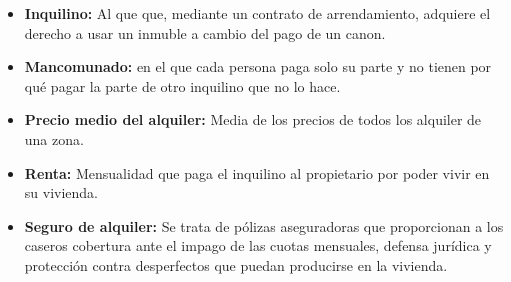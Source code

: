 \begin{itemize}
\item \textbf{Inquilino:} Al que que, mediante un contrato de arrendamiento, adquiere el derecho a usar un inmuble a cambio del pago de un canon.

\item \textbf{Mancomunado:} en el que cada persona paga solo su parte y no tienen por qué pagar la parte de otro inquilino que no lo hace. 

\item \textbf{Precio medio del alquiler:} Media de los precios de todos los alquiler de una zona.

\item \textbf{Renta:} Mensualidad que paga el inquilino al propietario por poder vivir en su vivienda.

\item \textbf{Seguro de alquiler:} Se trata de pólizas aseguradoras que proporcionan a los caseros cobertura ante el impago de las cuotas mensuales, defensa jurídica y protección contra desperfectos que puedan producirse en la vivienda.

\end{itemize}